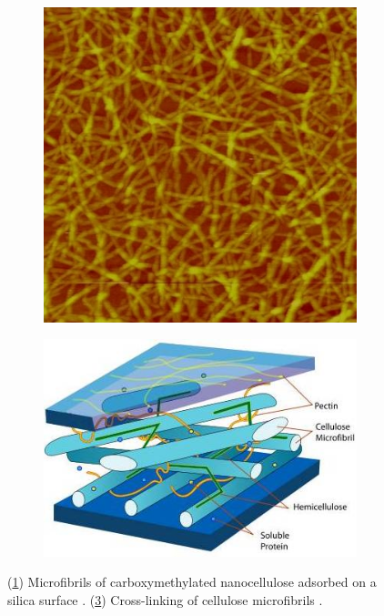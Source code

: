 \ClearMyMinHeight
{}

\begin{figure}\centering%
    \begin{subfigure}{0.45\linewidth}\centering
        \includegraphics[height=\myMinHeight]{img/AFM_Innventia_nanocellulose}
        \caption{}\label{fig:cellulose}
    \end{subfigure}%
    \hfill
    \begin{subfigure}{0.45\linewidth}\centering
        \includegraphics[height=\myMinHeight]{img/crosslink}
        \caption{}\label{fig:crosslink}
    \end{subfigure}%
    \caption{(\ref{fig:cellulose}) Microfibrils of carboxymethylated nanocellulose adsorbed on a silica surface \cite{wikimediacommons2010afm}. (\ref{fig:crosslink}) Cross-linking of cellulose microfibrils \cite{wikimediacommons2007plant}.}
\end{figure}%




